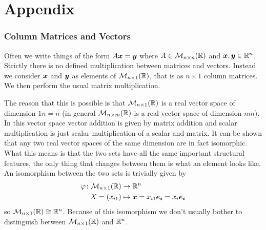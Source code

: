 \documentclass[a4paper]{article}
\newcommand{\nxmMatrices}[3]{\mathcal{M}_{{#1}\times{#2}}({#3})}
\begin{document}
    \part*{Appendix}
    \begingroup
    \let\clearpage\relax
    \endgroup
    \section{Column Matrices and Vectors}\label{app:column matrices and vectors}
    Often we write things of the form \(A\bm{x} = \bm{y}\) where \(A\in\nxmMatrices{n}{n}{\reals}\) and \(\bm{x}, \bm{y}\in\mathbb{R}^n\).
    Strictly there is no defined multiplication between matrices and vectors.
    Instead we consider \(\bm{x}\) and \(\bm{y}\) as elements of \(\nxmMatrices{n}{1}{\reals}\), that is as \(n\times 1\) column matrices.
    We then perform the usual matrix multiplication.
    
    The reason that this is possible is that \(\nxmMatrices{n}{1}{\reals}\) is a real vector space of dimension \(1n = n\) (in general \(\nxmMatrices{n}{m}{\reals}\) is a real vector space of dimension \(nm\)).
    In this vector space vector addition is given by matrix addition and scalar multiplication is just scalar multiplication of a scalar and matrix.
    It can be shown that any two real vector spaces of the same dimension are in fact isomorphic.
    What this means is that the two sets have all the same important structural features, the only thing that changes between them is what an element looks like.
    An isomorphism between the two sets is trivially given by
    \begin{align*}
        \varphi\colon\nxmMatrices{n}{1}{\reals} &\to \reals^n\\
        X = (x_{i1}) &\mapsto \vv{x} = x_{i1}\ve{i} = x_i\ve{i}
    \end{align*}
    so \(\nxmMatrices{n}{1}{\reals}\cong\reals^n\).
    Because of this isomorphism we don't usually bother to distinguish between \(\nxmMatrices{n}{1}{\reals}\) and \(\mathbb{R}^n\).
    
\end{document}
